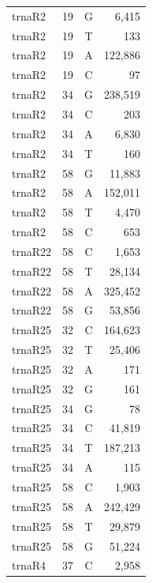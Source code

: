 \documentclass[12pt]{rockefeller}
\begin{document}
{\begin{center}
\begin{supertabular}{|l|r|c|r|}
  trnaR2 &        19 &          G &      6,415 \\
  trnaR2 &        19 &          T &        133 \\
  trnaR2 &        19 &          A &    122,886 \\
  trnaR2 &        19 &          C &         97 \\
  trnaR2 &        34 &          G &    238,519 \\
  trnaR2 &        34 &          C &        203 \\
  trnaR2 &        34 &          A &      6,830 \\
  trnaR2 &        34 &          T &        160 \\
  trnaR2 &        58 &          G &     11,883 \\
  trnaR2 &        58 &          A &    152,011 \\
  trnaR2 &        58 &          T &      4,470 \\
  trnaR2 &        58 &          C &        653 \\
 trnaR22 &        58 &          C &      1,653 \\
 trnaR22 &        58 &          T &     28,134 \\
 trnaR22 &        58 &          A &    325,452 \\
 trnaR22 &        58 &          G &     53,856 \\
 trnaR25 &        32 &          C &    164,623 \\
 trnaR25 &        32 &          T &     25,406 \\
 trnaR25 &        32 &          A &        171 \\
 trnaR25 &        32 &          G &        161 \\
 trnaR25 &        34 &          G &         78 \\
 trnaR25 &        34 &          C &     41,819 \\
 trnaR25 &        34 &          T &    187,213 \\
 trnaR25 &        34 &          A &        115 \\
 trnaR25 &        58 &          C &      1,903 \\
 trnaR25 &        58 &          A &    242,429 \\
 trnaR25 &        58 &          T &     29,879 \\
 trnaR25 &        58 &          G &     51,224 \\
  trnaR4 &        37 &          C &      2,958 \\

\end{supertabular}
\end{center}}
\end{document}
